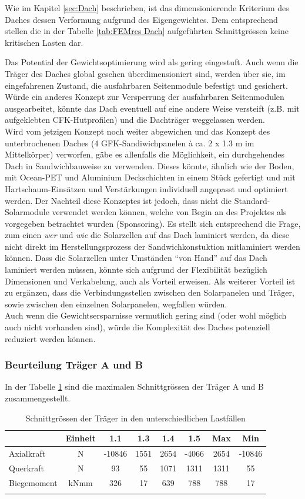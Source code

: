 Wie im Kapitel \ref{sec:Dach} beschrieben, ist das dimensionierende Kriterium des Daches dessen Verformung aufgrund des Eigengewichtes. Dem entsprechend stellen die in der Tabelle \ref{tab:FEMres Dach} aufgeführten Schnittgrössen keine kritischen Lasten dar.

Das Potential der Gewichtsoptimierung wird als gering eingestuft. Auch wenn die Träger des Daches global gesehen überdimensioniert sind, werden über sie, im eingefahrenen Zustand, die ausfahrbaren Seitenmodule befestigt und gesichert. Würde ein anderes Konzept zur Versperrung der ausfahrbaren Seitenmodulen ausgearbeitet, könnte das Dach eventuell auf eine andere Weise versteift (z.B. mit aufgeklebten CFK-Hutprofilen) und die Dachträger weggelassen werden.\\
Wird vom jetzigen Konzept noch weiter abgewichen und das Konzept des unterbrochenen Daches (4 GFK-Sandiwichpanelen à ca. 2 x 1.3 m im Mittelkörper) verworfen, gäbe es allenfalls die Möglichkeit, ein durchgehendes Dach in Sandwichbauweise zu verwenden. Dieses könnte, ähnlich wie der Boden, mit Ocean-PET und Aluminium Deckschichten in einem Stück gefertigt und mit Hartschaum-Einsätzen und Verstärkungen individuell angepasst und optimiert werden. Der Nachteil diese Konzeptes ist jedoch, dass nicht die Standard-Solarmodule verwendet werden können, welche von Begin an des Projektes als vorgegeben betrachtet wurden (Sponsoring). Es stellt sich entsprechend die Frage, zum einen \emph{wer} und \emph{wie} die Solarzellen auf das Dach laminiert werden, da diese nicht direkt im Herstellungsprozess der Sandwichkonstuktion mitlaminiert werden können. Dass die Solarzellen unter Umständen ``von Hand'' auf das Dach laminiert werden müssen, könnte sich aufgrund der Flexibilität bezüglich Dimensionen und Verkabelung, auch als Vorteil erweisen. Als weiterer Vorteil ist zu ergänzen, dass die Verbindungsstellen zwischen den Solarpanelen und Träger, sowie zwischen den einzelnen Solarpanelen, wegfallen würden.\\
Auch wenn die Gewichtsersparnisse vermutlich gering sind (oder wohl möglich auch nicht vorhanden sind), würde die Komplexität des Daches potenziell reduziert werden können.


\subsubsection{Beurteilung Träger A und B}
In der Tabelle \ref{tab:FEMres Träger} sind die maximalen Schnittgrössen der Träger A und B zusammengestellt.
\begin{table}[H]
\centering
\begin{tabular}{lccccccc}
\thickhline
	&	Einheit	&	1.1	&	1.3	&	1.4	&	1.5	&	Max	&	Min	\\	\hline
Axialkraft	&	N	&	-10846	&	1551	&	2654	&	-4066	&	2654	&	-10846	\\
Querkraft	&	N	&	93	&	55	&	1071	&	1311	&	1311	&	55	\\
Biegemoment	&	kNmm	&	326	&	17	&	639	&	788	&	788	&	17	\\	\thickhline
\end{tabular}
\caption{Schnittgrössen der Träger in den unterschiedlichen Lastfällen}
\label{tab:FEMres Träger}
\end{table}


